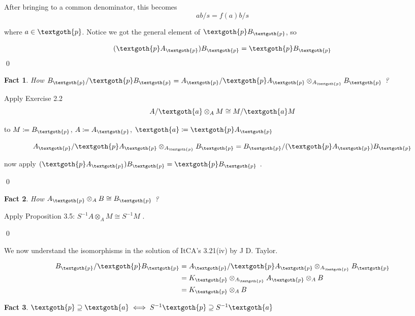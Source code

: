 \documentclass{article}
\newtheorem{theorem}{Fact}[section]
\begin{document}
\noindent
After bringing to a common denominator, this becomes
\[
 ab/s = f(a)b/s
\]


\noindent
where $a \in \textgoth{p}$. Notice we got the general element of $\textgoth{p} B_\textgoth{p}$, so

\[
 (\textgoth{p} A_\textgoth{p}) B_\textgoth{p} = \textgoth{p} B_\textgoth{p}
\]
\qed

\begin{theorem}
How $B_\textgoth{p}/\textgoth{p} B_\textgoth{p} = A_\textgoth{p}/\textgoth{p} A_\textgoth{p} \otimes_{A_\textgoth{p}} B_\textgoth{p}$ ?
\end{theorem}

Apply Exercise 2.2
\[
 A/\textgoth{a} \otimes_A M \cong M / \textgoth{a} M 
\]

\noindent
to $M \coloneqq B_\textgoth{p}$, $A \coloneqq A_\textgoth{p}$, $\textgoth{a} \coloneqq \textgoth{p} A_\textgoth{p}$

\[
 A_\textgoth{p}/\textgoth{p} A_\textgoth{p} \otimes_{A_\textgoth{p}} B_\textgoth{p} = B_\textgoth{p}/(\textgoth{p} A_\textgoth{p}) B_\textgoth{p}
\]

\noindent
now apply $(\textgoth{p} A_\textgoth{p}) B_\textgoth{p} = \textgoth{p} B_\textgoth{p}$ . 

\qed

\begin{theorem}
How $A_\textgoth{p} \otimes_A B \cong B_\textgoth{p}$ ?
\end{theorem}

Apply Proposition 3.5: $S^{-1}A \otimes_A M \cong S^{-1}M$ . 

\qed

\vspace{1em}
We now understand the isomorphisms in the solution of ItCA's 3.21(iv) by J D. Taylor.

\begin{equation*}
\begin{split}
 B_\textgoth{p}/\textgoth{p}B_\textgoth{p} 
 & = A_\textgoth{p}/\textgoth{p}A_\textgoth{p} 
 \otimes_{A_\textgoth{p}} B_\textgoth{p} \\ 
 & = K_\textgoth{p} \otimes_{A_\textgoth{p}} A_\textgoth{p} \otimes_A B \\
 & = K_\textgoth{p} \otimes_A B
\end{split}
\end{equation*}

\begin{theorem}
$\textgoth{p} \supseteq \textgoth{a} \iff S^{-1}\textgoth{p} \supseteq S^{-1}\textgoth{a}$
\end{theorem}
\end{document}
